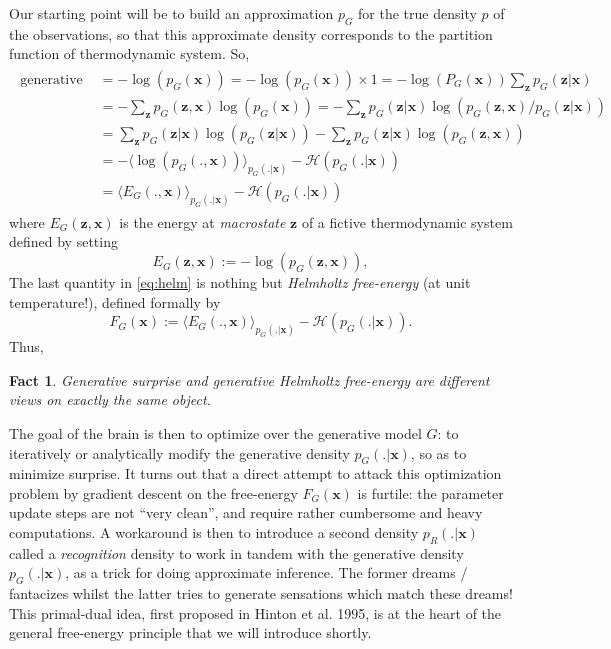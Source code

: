 \documentclass[10pt,letterpaper]{article}
\newtheorem{fact}[thm]{Fact}
\def\z{\mathbf{z}}
\def\x{\mathbf{x}}
\begin{document}
Our starting point will be to build an approximation $p_G$ for the true density $p$ of the observations, so that this approximate density corresponds to the partition function of thermodynamic system. So,
\begin{eqnarray}
  \begin{split}
    \text{generative surprise } &= -\log(p_G(\x)) = -\log(p_G(\x)) \times 1 = -\log(P_G(\x))\sum_{\z}p_G(\z |\x)\\
    &= -\sum_{\z}p_G(\z, \x)\log(p_G(\x))
    =-\sum_{\z}p_G(\z |\x)\log(p_G(\z, \x)/p_G(\z|\x))\\
    &= \sum_{\z}p_G(\z |\x)\log(p_G(\z|\x))-\sum_{\z}p_G(\z |\x)\log  (p_G(\z, \x))\\
    &= -\langle \log  (p_G(., \x)) \rangle_{p_G(. |\x)} - \mathcal H(p_G(. |\x))\\
    &= \langle E_G(., \x) \rangle_{p_G(. |\x)} - \mathcal H(p_G(. |\x))
  \end{split}
  \label{eq:helm}
\end{eqnarray}
where $E_G(\z, \x)$ is the energy at \textit{macrostate} $\z$ of a fictive thermodynamic system defined by setting
\begin{equation}
  E_G(\z, \x) := -\log(p_G(\z, \x)),
  \label{eq:gibbs}
\end{equation}
The last quantity in \eqref{eq:helm} is nothing but \textit{Helmholtz free-energy} (at unit temperature!), defined formally by
\begin{equation}
  F_G(\x) := \langle E_G(., \x) \rangle_{p_G(. |\x)} - \mathcal H(p_G(. |\x)).
\end{equation}
Thus,
\begin{fact}
  Generative surprise and generative Helmholtz free-energy are different views on exactly the same object.
\end{fact}

The goal of the brain is then to optimize over the generative model $G$: to iteratively or analytically modify the generative density $p_G(.|\x)$, so as to minimize surprise. It turns out that a direct attempt to attack this optimization problem by gradient descent on the free-energy $F_G(\x)$ is furtile: the parameter update steps are not ``very clean'', and require rather cumbersome and heavy computations. A workaround is then to introduce a second density $p_R(.|\x)$ called a \textit{recognition} density to work in tandem with the generative density $p_G(.|\x)$, as a trick for doing approximate inference. The former dreams / fantacizes whilst the latter tries to generate sensations which match these dreams! This primal-dual idea, first proposed in Hinton et al. 1995, is at the heart of the general free-energy principle that we will introduce shortly.
\end{document}
